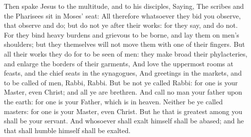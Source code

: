  Then spake Jesus to the multitude, and to his disciples,
 Saying, The scribes and the Pharisees sit in Moses' seat:
 All therefore whatsoever they bid you observe, that
observe and do; but do not ye after their works: for they say, and do
not.  For they bind heavy burdens and grievous to be
borne, and lay them on men's shoulders; but they themselves will not
move them with one of their fingers.  But all their works
they do for to be seen of men: they make broad their phylacteries, and
enlarge the borders of their garments,  And love the
uppermost rooms at feasts, and the chief seats in the synagogues,
 And greetings in the markets, and to be called of men,
Rabbi, Rabbi.  But be not ye called Rabbi: for one is your
Master, even Christ; and all ye are brethren.  And call no
man your father upon the earth: for one is your Father, which is in
heaven.  Neither be ye called masters: for one is your
Master, even Christ.  But he that is greatest among you
shall be your servant.  And whosoever shall exalt himself
shall be abased; and he that shall humble himself shall be exalted.

